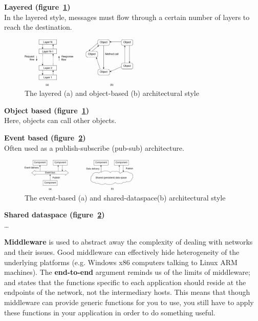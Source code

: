 \begin{description}
  \item \textbf{Layered (figure~\ref{layered})}\\
    In the layered style, messages must flow through a certain number of layers
    to reach the destination.
    \begin{figure}[H]
      \centering
      \includegraphics[width=0.5\textwidth]{images/layered}
      \caption{The layered (a) and object-based (b) architectural style}
      \label{layered}
    \end{figure}
  \item \textbf{Object based (figure~\ref{layered})}\\
    Here, objects can call other objects.
  \item \textbf{Event based (figure~\ref{event-based})}\\
    Often used as a publish-subscribe (pub-sub) architecture.
    \begin{figure}[H]
      \centering
      \includegraphics[width=0.5\textwidth]{images/event-based}
      \caption{The event-based (a) and shared-dataspace(b) architectural style}
      \label{event-based}
    \end{figure}
  \item \textbf{Shared dataspace (figure~\ref{event-based})}\\
    \dots
\end{description}

\textbf{Middleware} is used to abstract away the complexity of dealing with
networks and their issues. Good middleware can effectively hide heterogeneity of
the underlying platforms (e.g. Windows x86 computers talking to Linux ARM
machines). The \textbf{end-to-end} argument reminds us of the limits of
middleware; and states that the functions specific to each application should
reside at the endpoints of the network, not the intermediary hosts. This means
that though middleware can provide generic functions for you to use, you still
have to apply these functions in your application in order to do something
useful.

